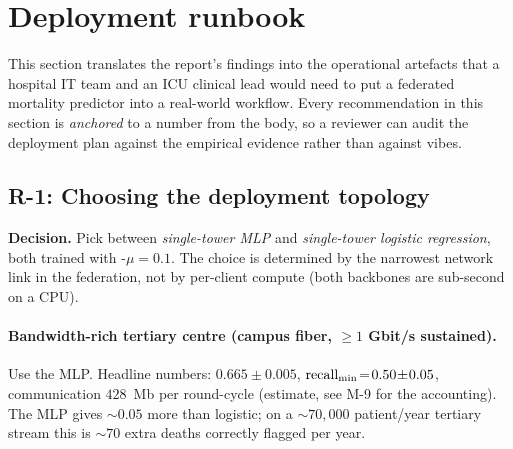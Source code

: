 \section{Deployment runbook}
\label{sec:runbook}

\noindent{}

\vspace{1em}

This section translates the report's findings into the
operational artefacts that a hospital IT team and an ICU clinical
lead would need to put a federated mortality predictor into a
real-world workflow. Every recommendation in this section is
\emph{anchored} to a number from the body, so a reviewer can audit
the deployment plan against the empirical evidence rather than
against vibes.

\subsection{R-1: Choosing the deployment topology}

\textbf{Decision.} Pick between \emph{single-tower MLP} and
\emph{single-tower logistic regression}, both trained with
\fedprox{}-$\mu\!=\!0.1$. The choice is determined by the
narrowest network link in the federation, not by per-client
compute (both backbones are sub-second on a CPU).

\paragraph{Bandwidth-rich tertiary centre (campus fiber, $\geq 1$ Gbit/s
sustained).} Use the MLP. Headline numbers: \auprc{} $0.665 \!\pm\!
0.005$, $\text{recall}_{\min}{}\!=\!0.50 \!\pm\! 0.05$, communication $428$~Mb
per round-cycle (estimate, see M-9 for the accounting). The MLP
gives $\sim$$0.05$ \auprc{} more than logistic; on a $\sim$$70{,}000$
patient/year tertiary stream this is $\sim$$70$ extra deaths
correctly flagged per year.

